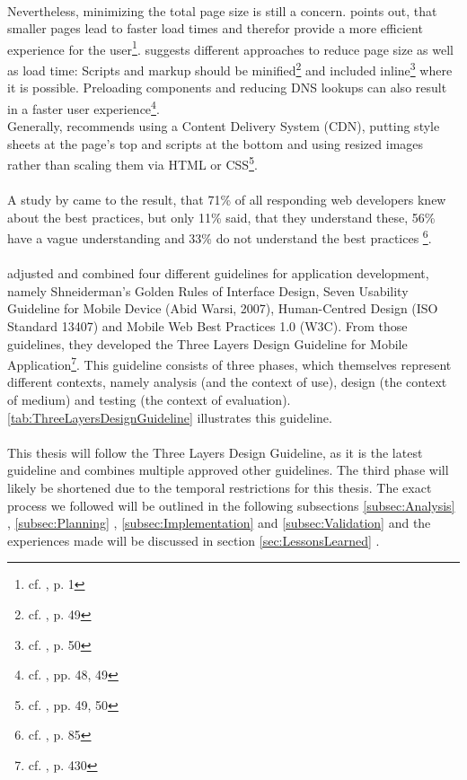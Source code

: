 \\
Nevertheless, minimizing the total page size is still a concern. \cite{Wessels.2011} points out, that smaller pages lead to faster load times and therefor provide a more efficient experience for the user\footnote{cf. \cite{Wessels.2011}, p. 1}. \cite{Nicolaou.2013} suggests different approaches to reduce page size as well as load time: Scripts and markup should be minified\footnote{cf. \cite{Nicolaou.2013}, p. 49} and included inline\footnote{cf. \cite{Nicolaou.2013}, p. 50} where it is possible. Preloading components and reducing DNS lookups can also result in a faster user experience\footnote{cf. \cite{Nicolaou.2013}, pp. 48, 49}.
\\
Generally, \cite{Nicolaou.2013} recommends using a Content Delivery System (CDN), putting style sheets at the page's top and scripts at the bottom and using resized images rather than scaling them via HTML or CSS\footnote{cf. \cite{Nicolaou.2013}, pp. 49, 50}.
\\
\\
A study by \cite{Dahanayake.2010} came to the result, that 71\% of all responding web developers knew about the best practices, but only 11\% said, that they understand these, 56\% have a vague understanding and 33\% do not understand the best practices \footnote{cf. \cite{Dahanayake.2010}, p. 85}.
\\
\\
\cite{AyobNurulZakiahbinti.2009} adjusted and combined four different guidelines for application development, namely Shneiderman’s Golden Rules of Interface Design, Seven Usability Guideline for Mobile Device (Abid Warsi, 2007), Human-Centred Design (ISO Standard 13407) and Mobile Web Best Practices 1.0 (W3C). From those guidelines, they developed the Three Layers Design Guideline for Mobile Application\footnote{cf. \cite{AyobNurulZakiahbinti.2009}, p. 430}. This guideline consists of three phases, which themselves represent different contexts, namely analysis (and the context of use), design (the context of medium) and testing (the context of evaluation). \ref{tab:ThreeLayersDesignGuideline} illustrates this guideline.
\\
\\
This thesis will follow the Three Layers Design Guideline, as it is the latest guideline and combines multiple approved other guidelines. The third phase will likely be shortened due to the temporal restrictions for this thesis. The exact process we followed will be outlined in the following subsections \ref{subsec:Analysis} , \ref{subsec:Planning} , \ref{subsec:Implementation}  and \ref{subsec:Validation}  and the experiences made will be discussed in section \ref{sec:LessonsLearned} .

